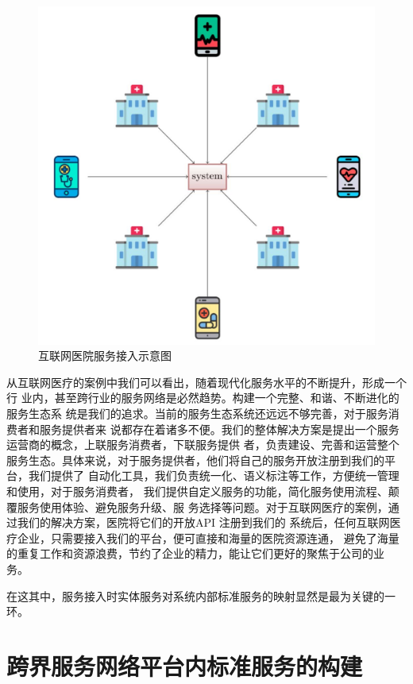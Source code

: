\begin{figure}[htbp]
    \centering
    \includegraphics[scale=0.5]{./images/serverAdvise.jpg}
    \caption{互联网医院服务接入示意图}
    \label{fig:serverAdvise}
  \end{figure}

从互联网医疗的案例中我们可以看出，随着现代化服务水平的不断提升，形成一个行
业内，甚至跨行业的服务网络是必然趋势。构建一个完整、和谐、不断进化的服务生态系
统是我们的追求。当前的服务生态系统还远远不够完善，对于服务消费者和服务提供者来
说都存在着诸多不便。我们的整体解决方案是提出一个服务运营商的概念，上联服务消费者，下联服务提供
者，负责建设、完善和运营整个服务生态。具体来说，对于服务提供者，他们将自己的服务开放注册到我们的平台，我们提供了
自动化工具，我们负责统一化、语义标注等工作，方便统一管理和使用，对于服务消费者，
我们提供自定义服务的功能，简化服务使用流程、颠覆服务使用体验、避免服务升级、服
务选择等问题。对于互联网医疗的案例，通过我们的解决方案，医院将它们的开放API 注册到我们的
系统后，任何互联网医疗企业，只需要接入我们的平台，便可直接和海量的医院资源连通，
避免了海量的重复工作和资源浪费，节约了企业的精力，能让它们更好的聚焦于公司的业
务。

在这其中，服务接入时实体服务对系统内部标准服务的映射显然是最为关键的一环。

\section{跨界服务网络平台内标准服务的构建}

